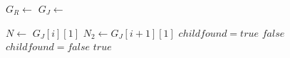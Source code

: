 \documentclass[letterpaper,11pt]{article}
\begin{document}
\begin{enumerate}
\begin{algorithm}
\begin{algorithmic}[1]
\State $G_R \gets$ 
\State $G_J \gets$ 

\State $N \gets$ $G_J[i][1]$
\State $N_2 \gets G_J[i+1][1]$
\State $childfound = true$
\EndIf
\EndFor
{}
\State \Return $false$
\EndIf
\State $childfound = false$
\EndFor
\State \Return $true$
\EndFunction
\end{algorithmic}
\end{algorithm}

\end{enumerate}
\end{document}
